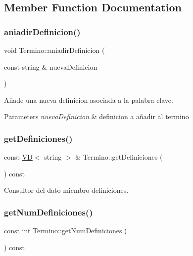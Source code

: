\subsection{Member Function Documentation}
\mbox{\label{class_termino_af65b85bcfa0d7514bffa2f01f529fd9a}} 
\subsubsection{\texorpdfstring{aniadir\+Definicion()}{aniadirDefinicion()}}
{\footnotesize\ttfamily void Termino\+::aniadir\+Definicion (\begin{DoxyParamCaption}\item[{const string \&}]{nueva\+Definicion }\end{DoxyParamCaption})}



Añade una nueva definicion asociada a la palabra clave. 


\begin{DoxyParams}{Parameters}
{\em nueva\+Definicion} & definicion a añadir al termino \\
\hline
\end{DoxyParams}
\mbox{\label{class_termino_ab8c2a16c1d69da9bc9d178f34ad39a23}} 
\subsubsection{\texorpdfstring{get\+Definiciones()}{getDefiniciones()}}
{\footnotesize\ttfamily const \mbox{\hyperlink{class_v_d}{VD}}$<$ string $>$ \& Termino\+::get\+Definiciones (\begin{DoxyParamCaption}{ }\end{DoxyParamCaption}) const}



Consultor del dato miembro definiciones. 

\mbox{\label{class_termino_aa27c2541b1445c1fe8b981786ed55a73}} 
\subsubsection{\texorpdfstring{get\+Num\+Definiciones()}{getNumDefiniciones()}}
{\footnotesize\ttfamily const int Termino\+::get\+Num\+Definiciones (\begin{DoxyParamCaption}{ }\end{DoxyParamCaption}) const}



